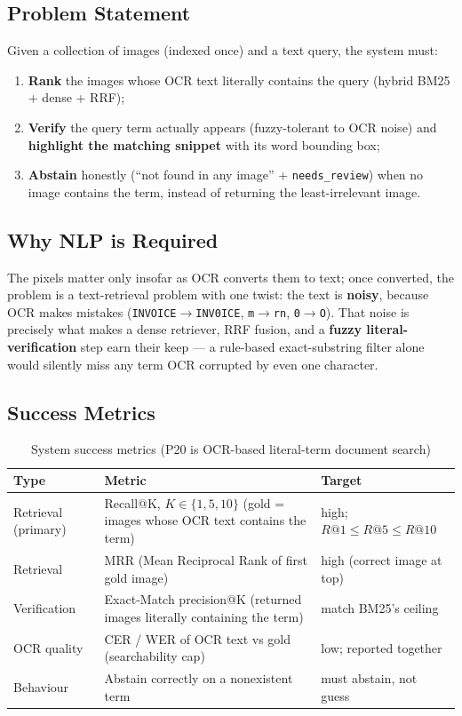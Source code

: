 \documentclass[12pt,a4paper]{article}
\begin{document}
\subsection{Problem Statement}

Given a collection of images (indexed once) and a text query, the system must:
\begin{enumerate}\setlength\itemsep{0.1em}
  \item \textbf{Rank} the images whose OCR text literally contains the query (hybrid BM25 + dense + RRF);
  \item \textbf{Verify} the query term actually appears (fuzzy-tolerant to OCR noise) and \textbf{highlight the matching snippet} with its word bounding box;
  \item \textbf{Abstain} honestly (``not found in any image'' + \texttt{needs\_review}) when no image contains the term, instead of returning the least-irrelevant image.
\end{enumerate}

\subsection{Why NLP is Required}

The pixels matter only insofar as OCR converts them to text; once converted, the problem is a text-retrieval problem with one twist: the text is \textbf{noisy}, because OCR makes mistakes (\texttt{INVOICE}$\rightarrow$\texttt{INV0ICE}, \texttt{m}$\rightarrow$\texttt{rn}, \texttt{0}$\rightarrow$\texttt{O}). That noise is precisely what makes a dense retriever, RRF fusion, and a \textbf{fuzzy literal-verification} step earn their keep --- a rule-based exact-substring filter alone would silently miss any term OCR corrupted by even one character.

\subsection{Success Metrics}

\begin{table}[H]
\centering
\caption{System success metrics (P20 is OCR-based literal-term document search)}
\begin{tabularx}{\linewidth}{@{} l L l @{}}
\toprule
\textbf{Type} & \textbf{Metric} & \textbf{Target} \\
\midrule
Retrieval (primary) & Recall@K, $K\in\{1,5,10\}$ (gold = images whose OCR text contains the term) & high; $R@1\le R@5\le R@10$ \\
Retrieval & MRR (Mean Reciprocal Rank of first gold image) & high (correct image at top) \\
Verification & Exact-Match precision@K (returned images literally containing the term) & match BM25's ceiling \\
OCR quality & CER / WER of OCR text vs gold (searchability cap) & low; reported together \\
Behaviour & Abstain correctly on a nonexistent term & must abstain, not guess \\
\bottomrule
\end{tabularx}
\end{table}
\end{document}
